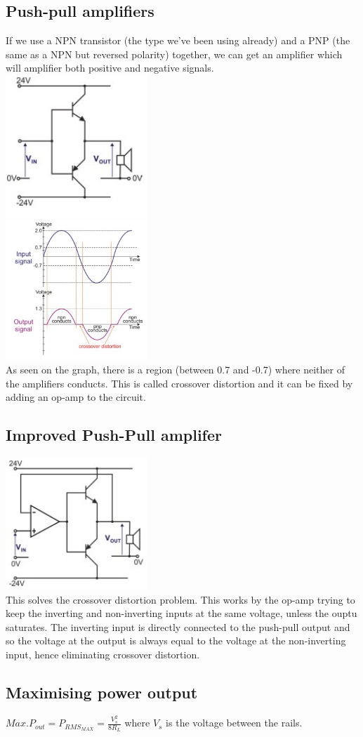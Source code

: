 \documentclass[a4paper, 11pt, twocolumn]{article}
\begin{document}
    \subsection{Push-pull amplifiers}
    If we use a NPN transistor (the type we've been using already) and a PNP (the same as a NPN but reversed polarity) together, we can get an amplifier which will amplifier both positive and negative signals.\\
    \includegraphics[width=0.4\textwidth]{pushPull.jpg}\\
    \includegraphics[width=0.4\textwidth]{pushPullOut.jpg} \\
    As seen on the graph, there is a region (between 0.7 and -0.7) where neither of the amplifiers conducts. This is called crossover distortion and it can be fixed by adding an op-amp to the circuit.

    \subsection{Improved Push-Pull amplifer}
    \includegraphics[width=0.4\textwidth]{opAmpPP.jpg}\\
    This solves the crossover distortion problem. This works by the op-amp trying to keep the inverting and non-inverting inputs at the same voltage, unless the ouptu saturates. The inverting input is directly connected to the push-pull output and so the voltage at the output is always equal to the voltage at the non-inverting input, hence eliminating crossover distortion.

    \subsection{Maximising power output}
    $Max.P_{out} = P_{RMS_{MAX}} = \frac{V_s^2}{8R_L}$ where $V_s$ is the voltage between the rails.
\end{document}
